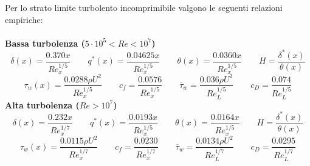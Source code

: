 \noindent Per lo strato limite turbolento incomprimibile valgono le seguenti relazioni empiriche:\\\\
\textbf{Bassa turbolenza ($5\cdot10^5<Re<10^7$)}
\begin{equation*}
    \delta(x) = \frac{0.370x}{Re_x^{1/5}} \qquad q^*(x) = \frac{0.04625 x}{Re_x^{1/5}} \qquad \theta(x) = \frac{0.0360 x}{Re_x^{1/5}} \qquad H=\frac{\delta^*(x)}{\theta(x)}
\end{equation*}
\begin{equation*}
    \tau_w(x) = \frac{0.0288 \rho U^2}{Re_x^{1/5}} \qquad c_f = \frac{0.0576}{Re_x^{1/5}} \qquad \overline \tau_w = \frac{0.036\rho U^2}{Re_L^{1/5}} \qquad c_D = \frac{0.074}{Re_L^{1/5}}
\end{equation*}
\textbf{Alta turbolenza ($Re>10^7$)}
\begin{equation*}
    \delta(x) = \frac{0.232x}{Re_x^{1/7}} \qquad q^*(x) = \frac{0.0193 x}{Re_x^{1/5}} \qquad \theta(x) = \frac{0.0164 x}{Re_x^{1/5}} \qquad H=\frac{\delta^*(x)}{\theta(x)}
\end{equation*}
\begin{equation*}
    \tau_w(x) = \frac{0.0115 \rho U^2}{Re_x^{1/7}} \qquad c_f = \frac{0.0230}{Re_x^{1/7}} \qquad \overline \tau_w = \frac{0.0134\rho U^2}{Re_L^{1/7}} \qquad c_D = \frac{0.0295}{Re_L^{1/7}}
\end{equation*}

